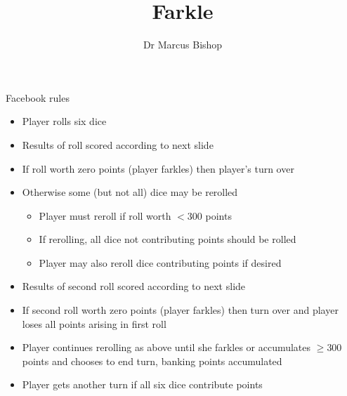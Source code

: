 \documentclass{beamer}
\title[Farkle]{Farkle}
\author{Dr Marcus Bishop}
\theoremstyle{definition}
\begin{document}
\begin{frame}\titlepage\end{frame}
\LogoOff

\begin{frame}{Facebook rules}
\begin{itemize}
\item Player rolls six dice
\item Results of roll scored according to next slide
\item If roll worth zero points (player \alert{farkles})
then player's turn over
\item Otherwise some (but not all) dice
\alert{may} be rerolled
\begin{itemize}
\item Player \alert{must} reroll
if roll worth $<300$ points
\item If rerolling, all dice not contributing points
should be rolled
\item Player \alert{may} also reroll dice contributing points if desired
\end{itemize}
\item Results of second roll scored according to next slide
\item If second roll worth zero points
(player \alert{farkles}) then turn over and
player loses all points arising in first roll
\item Player continues rerolling as above
until she farkles or accumulates $\ge 300$ points and
chooses to end turn, banking points accumulated
\item Player gets another turn if all six
dice contribute points
\end{itemize}
\end{frame}
\end{document}
